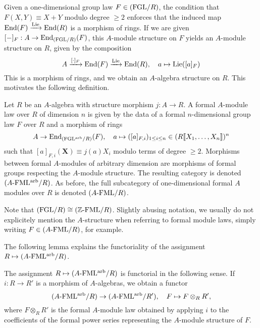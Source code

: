 \documentclass[../main.tex]{subfiles}
\begin{document}
Given a one-dimensional group law $F \in {(\mathrm{FGL}/{R})}$, the condition that 
$F(X,Y) \equiv X+Y$ modulo degree $\geq 2$ enforces that the induced map
$\operatorname{End}(F) \xrightarrow{\operatorname{Lie}} \operatorname{End}(R)$ is a morphism of rings. 
If we are given $[-]_F: A \to \operatorname{End}_{{(\mathrm{FGL}/{R})}}(F)$, this $A$-module structure on $F$ 
yields an $A$-module structure on $R$, given by the composition
\begin{equation*}
  A \xrightarrow{[\cdot]_F} \operatorname{End}(F) \xrightarrow{\operatorname{Lie}} \operatorname{End}(R), \quad a \mapsto \operatorname{Lie}([a]_F)
\end{equation*}
This is a morphism of rings, and we obtain an $A$-algebra structure on $R$. 
This motivates the following definition.
\begin{defi}\label{def:formalmodulelaw}
  Let $R$ be an $A$-algebra with structure morphism $j: A \to R$. A formal
  $A$-module law over $R$ of dimension $n$ is given by the data of 
  a formal $n$-dimensional group law $F$ over $R$ and a morphism of rings
  \begin{equation*}
    A \to \operatorname{End}_{{(\mathrm{FGL^{arb}}/{R})}} (F), \quad a \mapsto ([a]_{F,i}
    )_{1 \leq i \leq n} \in (R \llbracket X_1, \dots, X_n \rrbracket )^n
  \end{equation*}
  such that $[a]_{F,i}(\mathbf X) \equiv j(a) X_i$ modulo terms of degree 
  $\geq 2$. Morphisms between formal $A$-modules of arbitrary dimension are 
  morphisms of formal groups respecting the $A$-module structure. 
  The resulting category is denoted ${({A}\text-\allowbreak\mathrm{FML^{arb}}/{R})}$. As before, the full
  subcategory of one-dimensional formal $A$ modules over $R$ is denoted 
  ${({A}\text-\allowbreak\mathrm{FML}/{R})}$.
\end{defi}

Note that ${(\mathrm{FGL}/{R})} \cong {({\mathbb{Z}}\text-\allowbreak\mathrm{FML}/{R})}$.
Slightly abusing notation, we usually do not explicitely mention the $A$-structure
when referring to formal module laws, simply writing $F \in {({A}\text-\allowbreak\mathrm{FML}/{R})}$, for
example. 

The following lemma explains the functoriality of the assignment
$R \mapsto {({A}\text-\allowbreak\mathrm{FML^{arb}}/{R})}$.

\begin{lem}\label{lem:FMLFunc}
  The assignment $R \mapsto {({A}\text-\allowbreak\mathrm{FML^{arb}}/{R})}$ is functorial in the following sense.
  If $i: R \to R'$ is a morphism of $A$-algebras, we obtain a functor
  \begin{equation*}
    {({A}\text-\allowbreak\mathrm{FML^{arb}}/{R})} \to {({A}\text-\allowbreak\mathrm{FML^{arb}}/{R'})}, \quad F \mapsto F \otimes_R R',
  \end{equation*}
  where $F \otimes_R R'$ is the formal $A$-module law obtained by applying $i$
  to the coefficients of the formal power series representing the $A$-module
  structure of $F$. 
\end{lem}
\end{document}
